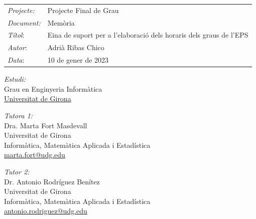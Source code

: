 \documentclass[a4paper,12pt]{ThesisStyle}
\begin{document}
\thispagestyle{empty}
\vspace*{\fill}

{\bfseries  \Large }
\vspace{0.75cm}

\begin{footnotesize}

  \begin{flushleft} 
    \begin{tabular}{ @{}lp{}@{} } 
    \emph{Projecte:}  & Projecte Final de Grau\\ 
    \emph{Document:}  & Memòria\\ 
    \emph{Títol}:    & Eina de suport per a l'elaboració dels horaris dels graus de l'EPS\\
    \emph{Autor}:   & Adrià Ribas Chico\\
    \emph{Data}:     & 10 de gener de 2023\\
    
    \end{tabular}
    \end{flushleft}
    
    \vspace{0.75cm}
    
    
    \begin{minipage}[t]{\textwidth}
      \begin{flushleft} 
        \emph{Estudi:}\\
        Grau en Enginyeria Informàtica\\
        \href{https://www.udg.edu}{Universitat de Girona}
      \end{flushleft}
    \end{minipage}
    
    \vspace{0.75cm}
    
    \begin{minipage}[t]{0.5\textwidth}
      \begin{flushleft} 
        \emph{Tutora 1:}\\
        Dra. Marta Fort Masdevall\\
        Universitat de Girona\\
        Informàtica, Matemàtica Aplicada i Estadística\\
        \href{mailto:marta.fort@udg.edu}{marta.fort@udg.edu}
      \end{flushleft}
    \end{minipage}
    
    \begin{minipage}[t]{0.5\textwidth}
      \begin{flushleft} 
        \emph{Tutor 2:}\\
        Dr. Antonio Rodríguez Benítez\\
        Universitat de Girona\\
        Informàtica, Matemàtica Aplicada i Estadística\\
        \href{mailto:antonio.rodriguez@udg.edu}{antonio.rodriguez@udg.edu}
      \end{flushleft}
    \end{minipage}

\end{footnotesize}
\end{document}

